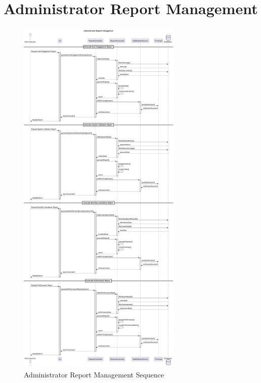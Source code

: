 \documentclass[12pt,a4paper]{report}
\begin{document}
\section{Administrator Report Management}
\begin{figure}[htbp]
    \centering
    \includegraphics[width=0.7\textwidth]{administrator-report-management-sequence.png}
    \caption{Administrator Report Management Sequence}
    \label{fig:administrator-report-management-sequence}
\end{figure}
\end{document}
